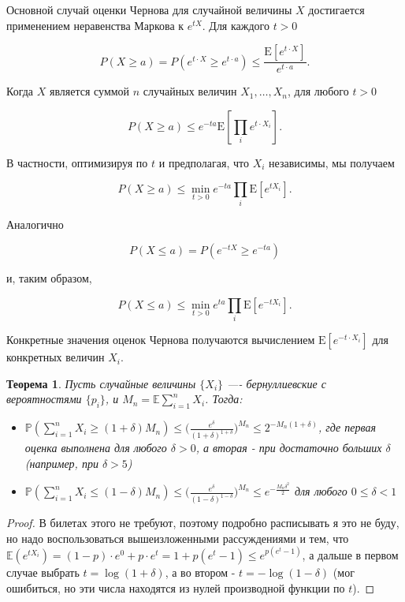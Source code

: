 \documentclass[a4paper]{article}
\theoremstyle{indented}
\newtheorem{theorem}{Теорема}
\theoremstyle{definition}
\theoremstyle{remark}
\begin{document}
Основной случай оценки Чернова для случайной величины $X$ достигается применением неравенства Маркова к $e^{tX}$. Для каждого $t > 0$ 

$$P(X \geq a) = P(e^{t\cdot X} \geq e^{t\cdot a}) \leq \frac{\mathrm{E}\left [e^{t\cdot X}\right]}{e^{t\cdot a}}.$$

Когда $X$ является суммой $n$ случайных величин $X_1, \ldots, X_n$, для любого $t > 0$

$$P(X \geq a) \leq e^{-ta}\mathrm{E} \left [\prod_i e^{t\cdot X_i} \right].$$

В частности, оптимизируя по $t$ и предполагая, что $X_i$ независимы, мы получаем

$$ P(X \geq a) \leq \min_{t>0} e^{-ta} \prod_i \mathrm{E} \left [e^{tX_i} \right ].$$ 

Аналогично

$$P(X \leq a) = P\left (e^{-tX} \ge e^{-ta}\right) $$

и, таким образом,

$$ P(X \leq a) \leq \min_{t>0} e^{ta} \prod_i \mathrm{E} \left[e^{-t X_i} \right ].$$

Конкретные значения оценок Чернова получаются вычислением $\mathrm{E} \left[e^{-t\cdot X_i} \right ]$ для конкретных величин $X_i$.
\\ 
\begin{theorem}
Пусть случайные величины $\{X_i\}$ —- бернуллиевские с вероятностями $\{p_i\}$, и $M_n=\mathbb{E}\sum_{i=1}^n X_i$. Тогда:
\begin{itemize}
\item $\mathbb{P}(\sum_{i=1}^n X_i \geq (1+\delta)M_n) \leq \big ( \frac{e^{\delta}}{(1+\delta)^{1+\delta}}\big )^{M_n} \leq 2^{-M_n(1+\delta)}$, где первая оценка выполнена для любого $\delta > 0$, а вторая - при достаточно больших $\delta$ (например, при $\delta > 5$)
\item $\mathbb{P}(\sum_{i=1}^n X_i \leq (1-\delta)M_n) \leq \big ( \frac{e^{\delta}}{(1-\delta)^{1-\delta}}\big )^{M_n} \leq e^{-\frac{M_n\delta^2}{2}}$ для любого $0 \leq \delta < 1$
\end{itemize}
\end{theorem}
\begin{proof}
В билетах этого не требуют, поэтому подробно расписывать я это не буду, но надо воспользоваться вышеизложенными рассуждениями и тем, что $\mathbb{E}(e^{tX_i})=(1-p)\cdot e^0+p \cdot e^t=1+p(e^t-1) \leq e^{p(e^t-1)}$, а дальше в первом случае выбрать $t=\log(1+\delta)$, а во втором - $t=-\log(1-\delta)$ (мог ошибиться, но эти числа находятся из нулей производной функции по $t$).
\end{proof}
\end{document}
